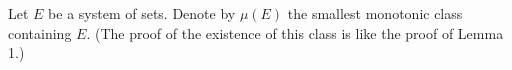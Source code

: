 Let $E$ be a system of sets. Denote by $\mu(E)$ the smallest monotonic class containing $E$. (The proof of the existence of this class is like the proof of Lemma 1.)

